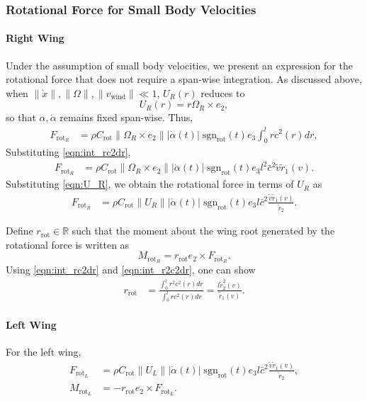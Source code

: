 \documentclass[10pt]{article}
\renewcommand{\Re}{\ensuremath{\mathbb{R}}}
\newcommand{\rot}{\ensuremath{\mathrm{rot}}}
\begin{document}
\subsubsection{Rotational Force for Small Body Velocities}

\paragraph{Right Wing}

Under the assumption of small body velocities, we present an expression for the rotational force that does not require a span-wise integration. 
As discussed above, when $\|\dot x\|,\|\Omega\|, \|v_{\mathrm{wind}}\| \ll 1$, $U_R(r)$ reduces to
\[
    U_R(r) = r \Omega_R \times e_2,
\]
so that $\alpha,\dot\alpha$ remains fixed span-wise. 
Thus,
\begin{align*}
    F_{\rot_R} & = \rho C_\rot  \|\Omega_R \times e_2 \| |\dot\alpha(t)|\; \mathrm{sgn}_\rot(t)  e_3 \int_0^l r c^2(r) dr,
\end{align*}
Substituting \eqref{eqn:int_rc2dr},
\begin{align*}
    F_{\rot_R} & = \rho C_\rot  \|\Omega_R \times e_2 \| |\dot\alpha(t)|\; \mathrm{sgn}_\rot(t)  e_3 l^2 \bar c^2 \tilde v \tilde r_1(v).
\end{align*}
Substituting \eqref{eqn:U_R}, we obtain the rotational force in terms of $U_R$ as 
\begin{align}
    F_{\rot_R} & = \rho C_\rot  \|U_R \| |\dot\alpha(t)|\; \mathrm{sgn}_\rot(t)  e_3 l \bar c^2 \frac{\tilde v \tilde r_1(v)}{\tilde r_2}. \label{eqn:F_rot}
\end{align}

Define $r_\rot\in\Re$ such that the moment about the wing root generated by the rotational force is written as
\begin{equation}
    M_{\rot_R} = r_\rot e_2 \times F_{\rot_R}.
\end{equation}
Using \eqref{eqn:int_rc2dr} and \eqref{eqn:int_r2c2dr}, one can show
\begin{align}
    r_\rot & = \frac{\int_0^l r^2 c^2(r) dr}{\int_0^l r c^2(r) dr} = \frac{l\tilde r_2^2(v)}{\tilde r_1(v)}.
\end{align}

\paragraph{Left Wing}

For the left wing,
\begin{align}
    F_{\rot_L} & = \rho C_\rot  \|U_L \| |\dot\alpha(t)|\; \mathrm{sgn}_\rot(t)  e_3 l \bar c^2 \frac{\tilde v \tilde r_1(v)}{\tilde r_2}, \label{eqn:F_rot_L}\\
    M_{\rot_L} &  = -r_\rot e_2 \times F_{\rot_L}.
\end{align}
\end{document}

